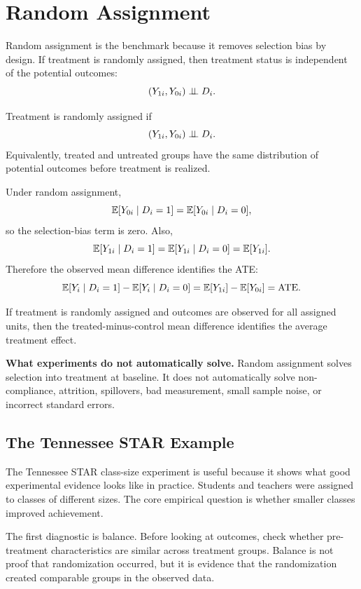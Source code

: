 \section{Random Assignment}

Random assignment is the benchmark because it removes selection bias by design.
If treatment is randomly assigned, then treatment status is independent of the
potential outcomes:
\[
    (Y_{1i},Y_{0i}) \perp\!\!\!\perp D_i.
\]

\begin{assN}
Treatment is randomly assigned if
\[
    (Y_{1i},Y_{0i}) \perp\!\!\!\perp D_i.
\]
Equivalently, treated and untreated groups have the same distribution of
potential outcomes before treatment is realized.
\end{assN}

Under random assignment,
\[
    \mathbb{E}[Y_{0i}\mid D_i=1]=\mathbb{E}[Y_{0i}\mid D_i=0],
\]
so the selection-bias term is zero. Also,
\[
    \mathbb{E}[Y_{1i}\mid D_i=1]=\mathbb{E}[Y_{1i}\mid D_i=0]=\mathbb{E}[Y_{1i}].
\]
Therefore the observed mean difference identifies the ATE:
\[
    \mathbb{E}[Y_i\mid D_i=1]-\mathbb{E}[Y_i\mid D_i=0]
    =
    \mathbb{E}[Y_{1i}]-\mathbb{E}[Y_{0i}]
    =
    \mathrm{ATE}.
\]

\begin{thmN}
If treatment is randomly assigned and outcomes are observed for all assigned
units, then the treated-minus-control mean difference identifies the average
treatment effect.
\end{thmN}

\begin{boxF}
\textbf{What experiments do not automatically solve.} Random assignment solves
selection into treatment at baseline. It does not automatically solve
non-compliance, attrition, spillovers, bad measurement, small sample noise, or
incorrect standard errors.
\end{boxF}

\subsection{The Tennessee STAR Example}

The Tennessee STAR class-size experiment is useful because it shows what good
experimental evidence looks like in practice. Students and teachers were
assigned to classes of different sizes. The core empirical question is whether
smaller classes improved achievement.

The first diagnostic is balance. Before looking at outcomes, check whether
pre-treatment characteristics are similar across treatment groups. Balance is
not proof that randomization occurred, but it is evidence that the randomization
created comparable groups in the observed data.

